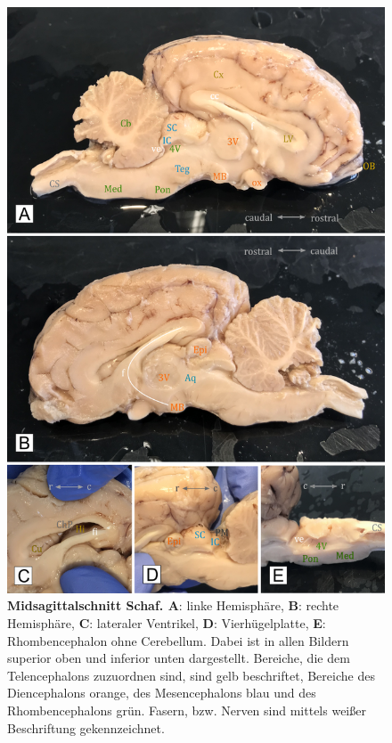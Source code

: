 \documentclass[12pt,a4paper,pdftex]{article}
\begin{document}
\begin{figure}[H]
\centering
\begin{minipage}[b]{.8\textwidth}
\includegraphics[width=\textwidth]{pictures/Bilder_Jule/Schaf/mittsagittal/schaf_mittsagittal_alle.png}
\end{minipage}
\caption[Midsagittalschnitt Schaf]{\textbf{Midsagittalschnitt Schaf. A}: linke Hemisphäre, \textbf{B}: rechte Hemisphäre, \textbf{C}: lateraler Ventrikel, \textbf{D}: Vierhügelplatte, \textbf{E}: Rhombencephalon ohne Cerebellum. Dabei ist in allen Bildern superior oben und inferior unten dargestellt. Bereiche, die dem Telencephalons zuzuordnen sind, sind gelb beschriftet, Bereiche des Diencephalons orange, des Mesencephalons blau und des Rhombencephalons grün. Fasern, bzw. Nerven sind mittels weißer Beschriftung gekennzeichnet.}
\label{fig:schaf_midsagittal}
\end{figure}
\end{document}
